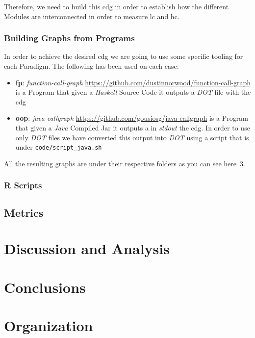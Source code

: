 \documentclass[12pt, a4paper]{article}
\begin{document}
Therefore, we need to build this \acrlong{cdg} in order to establish how the different Modules are interconnected in order to measure \acrshort{lc} and \acrshort{hc}.

\subsubsection{Building Graphs from Programs}
In order to achieve the desired \acrlong{cdg} we are going to use some specific tooling for each Paradigm.
The following has been used on each case:

\begin{itemize}
    \item \textbf{\acrlong{fp}}: \textit{function-call-graph} \url{https://github.com/dustinnorwood/function-call-graph} is a Program that given a \textit{Haskell} Source Code it outputs a \textit{DOT} file with the \acrlong{cdg}
    \item \textbf{\acrlong{oop}}: \textit{java-callgraph} \url{https://github.com/gousiosg/java-callgraph} is a Program that given a \textit{Java} Compiled Jar it outputs a in \textit{stdout} the \acrlong{cdg}. In order to use only \textit{DOT} files we have converted this output into \textit{DOT} using a script that is under \texttt{code/script_java.sh}
\end{itemize}

All the resulting graphs are under their respective folders as you can see here~\ref{apx:sec:org:1}.

\subsubsection{R Scripts}

\subsection{Metrics}

\section{Discussion and Analysis}
\section{Conclusions}




\appendix
\section{Organization}\label{apx:sec:org:1}
\end{document}
